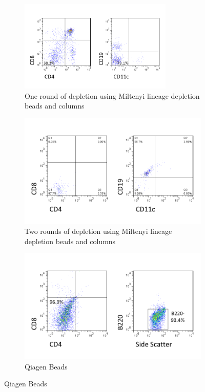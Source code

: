 \begin{figure}
	\begin{subfigure}{\textwidth}
	\includegraphics[width=0.8\textwidth]{Figures/1rounddepletion.png}
	\caption{One round of depletion using Miltenyi lineage depletion beads and columns}
	\label{subfig:1rounddep}
	\end{subfigure}
	
	\begin{subfigure}{0.8\textwidth}
	\includegraphics[width=\textwidth]{Figures/2rounddepletion.png}
	\caption{Two rounds of depletion using Miltenyi lineage depletion beads and columns}
	\label{subfig:2rounddep}
	\end{subfigure}
	
	\begin{subfigure}{0.8\textwidth}
	\includegraphics[width=\textwidth] {Figures/Qiagenbeads.png}
	\caption{Qiagen Beads}
	\label{subfig:Qiagen}
	\end{subfigure}
	

\end{figure}
